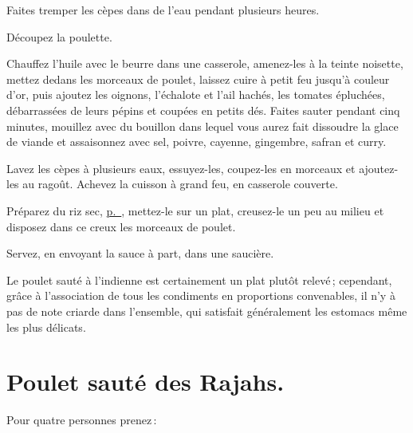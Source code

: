 Faites tremper les cèpes dans de l'eau pendant plusieurs heures.

Découpez la poulette.

Chauffez l'huile avec le beurre dans une casserole, amenez-les à la teinte
noisette, mettez dedans les morceaux de poulet, laissez cuire à petit feu
jusqu'à couleur d'or, puis ajoutez les oignons, l'échalote et l'ail hachés, les
tomates épluchées, débarrassées de leurs pépins et coupées en petits dés.
Faites sauter pendant cinq minutes, mouillez avec du bouillon dans lequel vous
aurez fait dissoudre la glace de viande et assaisonnez avec sel, poivre,
cayenne, gingembre, safran et curry.

Lavez les cèpes à plusieurs eaux, essuyez-les, coupez-les en morceaux et
ajoutez-les au ragoût. Achevez la cuisson à grand feu, en casserole couverte.

Préparez du riz sec, \hyperlink{p0707}{p. \pageref{pg0707}}, mettez-le sur un plat,
creusez-le un peu au milieu et disposez dans ce creux les morceaux de poulet.

Servez, en envoyant la sauce à part, dans une saucière.

Le poulet sauté à l'indienne est certainement un plat plutôt relevé ;
cependant, grâce à l'association de tous les condiments en proportions
convenables, il n'y à pas de note criarde dans l’ensemble, qui satisfait
généralement les estomacs même les plus délicats.

\section*{\centering Poulet sauté des Rajahs.}
{}

Pour quatre personnes prenez :

